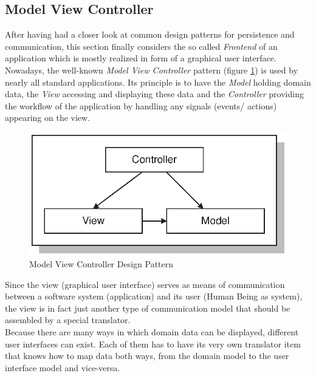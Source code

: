 %
%
%
%
%
%
%

\subsection{Model View Controller}
\label{model_view_controller_heading}

After having had a closer look at common design patterns for persistence and
communication, this section finally considers the so called \emph{Frontend} of
an application which is mostly realized in form of a graphical user interface.\\
Nowadays, the well-known \emph{Model View Controller} pattern (figure
\ref{model_view_controller_figure}) is used by nearly all standard applications.
Its principle is to have the \emph{Model} holding domain data, the \emph{View}
accessing and displaying these data and the \emph{Controller} providing the
workflow of the application by handling any signals (events/ actions) appearing
on the view.

\begin{figure}[ht]
    \begin{center}
       \includegraphics[scale=0.7]{vector/model_view_controller.eps}
       \caption{Model View Controller Design Pattern}
       \label{model_view_controller_figure}
    \end{center}
\end{figure}

Since the view (graphical user interface) serves as means of communication between
a software system (application) and its user (Human Being as system), the view
is in fact just another type of communication model that should be assembled
by a special translator.\\
Because there are many ways in which domain data can be displayed, different
user interfaces can exist. Each of them has to have its very own translator item
that knows how to map data both ways, from the domain model to the user interface
model and vice-versa.

